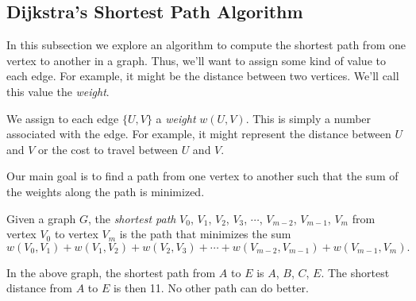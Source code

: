 \documentclass[11pt]{article}
\begin{document}
\subsection{Dijkstra's Shortest Path Algorithm}

In this subsection we explore an algorithm to compute the shortest path from one vertex to another in a graph.
Thus, we'll want to assign some kind of value to each edge. For example, it might be the distance between two
vertices. We'll call this value the \textit{weight}.

\begin{definition}
\label{def:weight}
We assign to each edge $\{U,V\}$ a \textit{weight} $w(U,V)$. This is simply a number associated with the edge.
For example, it might represent the distance between $U$ and $V$ or the cost to travel between $U$ and $V$.
\end{definition}

Our main goal is to find a path from one vertex to another such that the sum of the weights along the path is
minimized.

\begin{definition}
\label{def:shortest-path}
Given a graph $G$, the \textit{shortest path} $V_0$, $V_1$, $V_2$, $V_3$, $\cdots$, $V_{m-2}$, $V_{m-1}$, $V_m$
from vertex $V_0$ to vertex $V_m$ is the path that minimizes
the sum
\[w(V_0,V_1) + w(V_1,V_2) + w(V_2, V_3) + \cdots + w(V_{m-2}, V_{m-1}) + w(V_{m-1}, V_{m}).\]
\begin{center}
\end{center}
In the above graph, the shortest path from $A$ to $E$ is $A$, $B$, $C$, $E$. The shortest
distance from $A$ to $E$ is then 11. No other path can do better.
\end{definition}
\end{document}
